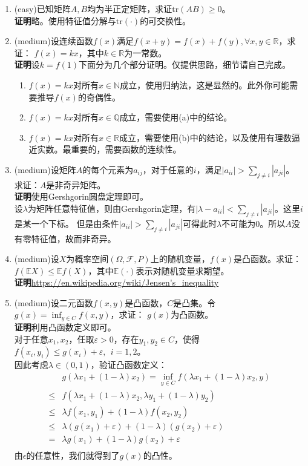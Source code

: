 \documentclass[a4paper]{article}
\begin{document}
\begin{enumerate}
\item (easy)已知矩阵$A,B$均为半正定矩阵，求证$\mathrm{tr}(AB)\geqslant0$。\\
\textbf{证明}\quad 略。使用特征值分解与$\mathrm{tr}(\cdot)$的可交换性。
\item (medium)设连续函数$f(x)$满足$f(x+y)=f(x)+f(y),\forall x,y \in \mathbb{R}$，求证：
$f(x)=kx$，其中$k\in \mathbb{R}$为一常数。\\
\textbf{证明}\quad 设$k=f(1)$下面分为几个部分证明。仅提供思路，细节请自己完成。
\begin{enumerate}
\item $f(x)=kx$对所有$x\in\mathbb{N}$成立，使用归纳法，这是显然的。此外你可能需要推导$f(x)$的奇偶性。
\item $f(x)=kx$对所有$x\in\mathbb{Q}$成立，需要使用(a)中的结论。
\item $f(x)=kx$对所有$x\in\mathbb{R}$成立，需要使用(b)中的结论，以及使用有理数逼近实数。最重要的，需要函数的连续性。
\end{enumerate}
\item (medium)设矩阵$A$的每个元素为$a_{ij}$，对于任意的$i$，满足$|a_{ii}|>\sum_{j\neq i}{|a_{ji}|}$。
求证：$A$是非奇异矩阵。\\
\textbf{证明}\quad 使用Gershgorin圆盘定理即可。\\
设$\lambda$为矩阵任意特征值，则由Gershgorin定理，有$|\lambda - a_{ii}|<\sum_{j\neq i}{|a_{ji}|}$。这里$i$是某一个下标。
但是由条件$|a_{ii}|>\sum_{j\neq i}{|a_{ji}|}$可得此时$\lambda$不可能为0。所以$A$没有零特征值，故而非奇异。
\item (medium)设$X$为概率空间$(\Omega,\mathcal{F},P)$上的随机变量，$f(x)$是凸函数。求证：
$f(\mathbb{E}X)\leqslant \mathbb{E}f(X)$，其中$\mathbb{E}(\cdot)$表示对随机变量求期望。\\
\textbf{证明}\quad \url{https://en.wikipedia.org/wiki/Jensen's_inequality}
\item (medium)设二元函数$f(x,y)$是凸函数，$C$是凸集。令$g(x)=\inf_{y\in C}f(x,y)$，求证：
$g(x)$为凸函数。\\
\textbf{证明}\quad 利用凸函数定义即可。\\
对于任意$x_1,x_2$，任取$\varepsilon>0$，存在$y_1,y_2\in C$，使得$f(x_i,y_i)\leqslant g(x_i)+\varepsilon,~~i=1,2$。\\
因此考虑$\lambda \in (0, 1)$，验证凸函数定义：
\[
\begin{split}
&g(\lambda x_1+(1-\lambda)x_2)=\inf_{y\in C}f(\lambda x_1+(1-\lambda) x_2, y)\\
\leqslant &f(\lambda x_1+(1-\lambda)x_2,\lambda y_1+(1-\lambda)y_2)\\
\leqslant &\lambda f(x_1,y_1)+(1-\lambda)f(x_2,y_2)\\
\leqslant &\lambda (g(x_1)+\varepsilon)+(1-\lambda)(g(x_2)+\varepsilon)\\
=&\lambda g(x_1)+(1-\lambda) g(x_2)+\varepsilon\\
\end{split}
\]
由$\epsilon$的任意性，我们就得到了$g(x)$的凸性。
\end{enumerate}
\end{document}
